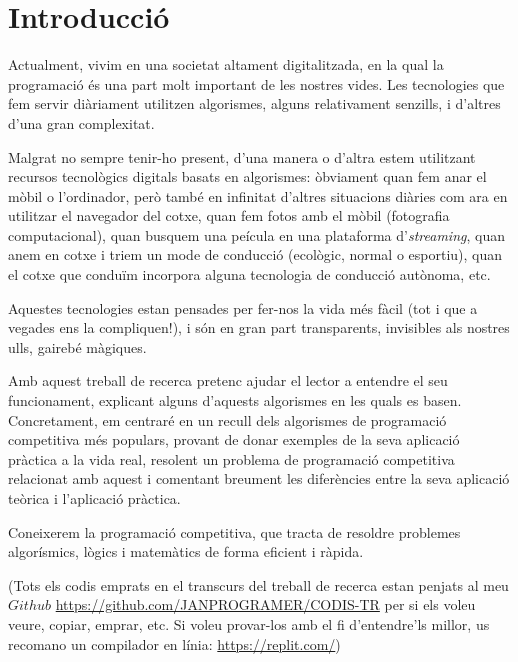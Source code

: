 \chapter{Introducció}


Actualment, vivim en una societat altament digitalitzada, en la qual la programació és una part molt important de les nostres vides. Les tecnologies que fem servir diàriament utilitzen algorismes, alguns relativament senzills, i d'altres d'una gran complexitat. \newline

Malgrat no sempre tenir-ho present, d'una manera o d'altra estem utilitzant recursos tecnològics digitals basats en algorismes: òbviament quan fem anar el mòbil o l'ordinador, però també en infinitat d'altres situacions diàries com ara en utilitzar el navegador del cotxe, quan fem fotos amb el mòbil (fotografia computacional), quan busquem una pe\lgem ícula en una plataforma d'\emph{streaming}, quan anem en cotxe i triem un mode de conducció (ecològic, normal o esportiu), quan el cotxe que conduïm incorpora alguna tecnologia de conducció autònoma, etc. \newline

Aquestes tecnologies estan pensades per fer-nos la vida més fàcil (tot i que a vegades ens la compliquen!), i són en gran part transparents, invisibles als nostres ulls, gairebé màgiques. \newline 

Amb aquest treball de recerca pretenc ajudar el lector a entendre el seu funcionament, explicant alguns d'aquests algorismes en les quals es basen. Concretament, em centraré en un recull dels algorismes de programació competitiva més populars, provant de donar exemples de la seva aplicació pràctica a la vida real, resolent un problema de programació competitiva relacionat amb aquest i comentant breument les diferències entre la seva aplicació teòrica i l'aplicació pràctica.  \newline



Coneixerem la programació competitiva, que tracta de resoldre problemes algorísmics, lògics i matemàtics de forma eficient i ràpida. \newline

(Tots els codis emprats en el transcurs del treball de recerca estan penjats al meu $Github$ \url{https://github.com/JANPROGRAMER/CODIS-TR} per si els voleu veure, copiar, emprar, etc. Si voleu provar-los amb el fi d’entendre'ls millor, us recomano un compilador en línia:  \url{https://replit.com/})
